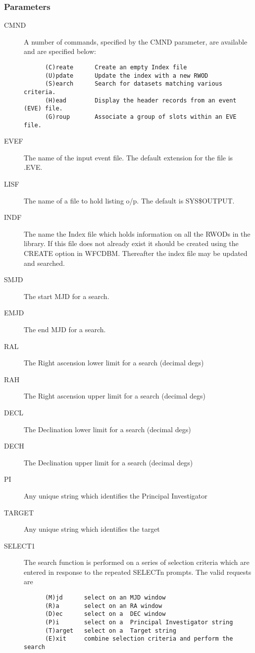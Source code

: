 \subsubsection{Parameters}
\begin{description}
\item [CMND]
A number of commands, specified by the CMND parameter, are available 
and are specified below:
\begin{verbatim}
      (C)reate      Create an empty Index file
      (U)pdate      Update the index with a new RWOD
      (S)earch      Search for datasets matching various criteria.
      (H)ead        Display the header records from an event (EVE) file.
      (G)roup       Associate a group of slots within an EVE file.
\end{verbatim}
\item[EVEF   ]
The name of the input event file. The default extension for the file is .EVE.
\item[LISF   ]
The name of a file to hold listing o/p. The default is SYS\$OUTPUT.
\item[INDF   ]
The name the Index file which holds information on all the RWODs
in the library. If this file does not already exist it should be created 
using the CREATE option in WFCDBM. Thereafter the index file may be 
updated and searched.
\item[SMJD   ]
The start MJD for a search.
\item[EMJD   ]
The end MJD for a search.
\item[RAL    ]
The Right ascension lower limit for a search (decimal degs)
\item[RAH    ]
The Right ascension upper limit for a search (decimal degs)
\item[DECL   ]
The Declination lower limit for a search (decimal degs)
\item[DECH   ]
The Declination upper limit for a search (decimal degs)
\item[PI   ]
Any unique string which identifies the Principal Investigator
\item[TARGET   ]
Any unique string which identifies the target
\item[SELECT1]
The search function is performed on a series of selection criteria
which are entered in response to the repeated SELECTn prompts. The valid 
requests are

\begin{verbatim}
      (M)jd      select on an MJD window
      (R)a       select on an RA window
      (D)ec      select on a  DEC window
      (P)i       select on a  Principal Investigator string
      (T)arget   select on a  Target string
      (E)xit     combine selection criteria and perform the search
\end{verbatim}


\end{description}
